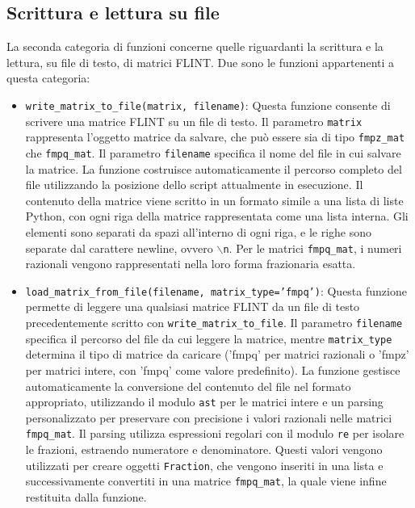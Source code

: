 \subsection{Scrittura e lettura su file}

La seconda categoria di funzioni concerne quelle riguardanti la scrittura e la lettura,
su file di testo, di matrici FLINT.
Due sono le funzioni appartenenti a questa categoria:

\begin{itemize}
    \item \texttt{write\_matrix\_to\_file(matrix, filename)}: 
    Questa funzione consente di scrivere una matrice FLINT su un file di testo.
    Il parametro \texttt{matrix} rappresenta l'oggetto matrice da salvare, che può
    essere sia di tipo \texttt{fmpz\_mat} che \texttt{fmpq\_mat}. 
    Il parametro \texttt{filename} specifica il nome del file
    in cui salvare la matrice. La funzione costruisce automaticamente il percorso
    completo del file utilizzando la posizione dello script attualmente in esecuzione. Il contenuto
    della matrice viene scritto in un formato simile a una lista di liste Python,
    con ogni riga della matrice rappresentata come una lista interna. Gli elementi
    sono separati da spazi all'interno di ogni riga, e le righe sono separate dal
    carattere newline, ovvero \texttt{$\backslash$n}. Per le matrici \texttt{fmpq\_mat}, i
     numeri razionali
    vengono rappresentati nella loro forma frazionaria esatta.
    \item \texttt{load\_matrix\_from\_file(filename, matrix\_type='fmpq')}: 
    Questa funzione permette di leggere una qualsiasi matrice FLINT da un file di testo 
    precedentemente scritto con \texttt{write\_matrix\_to\_file}. 
    Il parametro \texttt{filename} specifica il percorso del file da cui leggere la matrice,
    mentre \texttt{matrix\_type} determina il tipo di matrice da caricare 
    ('fmpq' per matrici razionali o 'fmpz' per matrici intere, con 'fmpq' come valore 
    predefinito). La funzione
    gestisce automaticamente la conversione del contenuto del file nel formato appropriato,
    utilizzando il modulo \texttt{ast} per le matrici intere e un parsing personalizzato
    per preservare con precisione i valori razionali nelle matrici \texttt{fmpq\_mat}.
    Il parsing utilizza espressioni regolari con il modulo \texttt{re} per isolare le frazioni, 
    estraendo numeratore e denominatore. Questi valori vengono utilizzati per creare 
    oggetti \texttt{Fraction}, che vengono inseriti in una lista e successivamente convertiti 
    in una matrice \texttt{fmpq\_mat}, la quale viene infine restituita dalla funzione.

\end{itemize}
